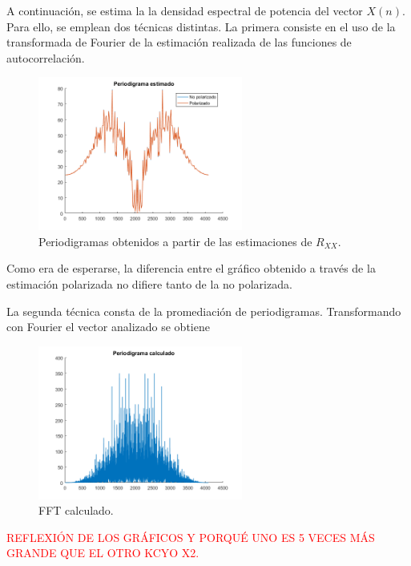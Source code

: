 A continuación, se estima la la densidad espectral de potencia del vector $X(n)$. Para ello, se emplean dos técnicas distintas. La primera consiste en el uso de la transformada de Fourier de la estimación realizada de las funciones de autocorrelación.
\begin{figure}[H]
\centering
	\includegraphics[width=0.6\textwidth, trim = {0 0 0 0.725cm},clip]{./ImagenesEjercicio2/period-est.png}
	\caption{Periodigramas obtenidos a partir de las estimaciones de $R_{XX}$.}
	\label{fig:period-est}
\end{figure}

Como era de esperarse, la diferencia entre el gráfico obtenido a través de la estimación polarizada no difiere tanto de la no polarizada.

La segunda técnica consta de la promediación de periodigramas. Transformando con Fourier el vector analizado se obtiene
\begin{figure}[H]
\centering
	\includegraphics[width=0.6\textwidth, trim = {0 0 0 0.725cm},clip]{./ImagenesEjercicio2/period-calc.png}
	\caption{FFT calculado.}
	\label{fig:fft-calc}
\end{figure}

\textcolor{red}{REFLEXIÓN DE LOS GRÁFICOS Y PORQUÉ UNO ES 5 VECES MÁS GRANDE QUE EL OTRO KCYO X2.}


